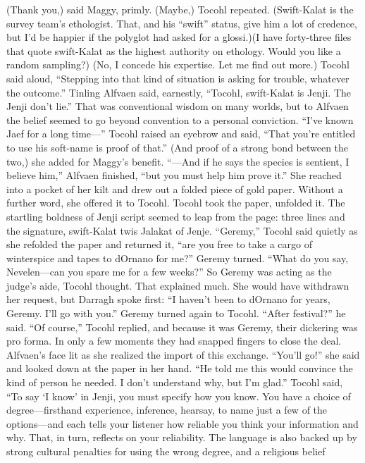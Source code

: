 \documentclass[9pt]{article}
\begin{document}
(Thank you,) said Maggy, primly.
(Maybe,) Tocohl repeated. (Swift-Kalat is the survey team’s ethologist. That, and his “swift” status,
give him a lot of credence, but I’d be happier if the polyglot had asked for a glossi.)(I have forty-three files that quote swift-Kalat as the highest authority on ethology. Would you like a
random sampling?)
(No, I concede his expertise. Let me find out more.) Tocohl said aloud, “Stepping into that kind of
situation is asking for trouble, whatever the outcome.”
Tinling Alfvaen said, earnestly, “Tocohl, swift-Kalat is Jenji. The Jenji don’t lie.” That was
conventional wisdom on many worlds, but to Alfvaen the belief seemed to go beyond convention to a
personal conviction. “I’ve known Jaef for a long time—”
Tocohl raised an eyebrow and said, “That you’re entitled to use his soft-name is proof of that.” (And
proof of a strong bond between the two,) she added for Maggy’s benefit.
“—And if he says the species is sentient, I believe him,” Alfvaen finished, “but you must help him
prove it.” She reached into a pocket of her kilt and drew out a folded piece of gold paper. Without a
further word, she offered it to Tocohl.
Tocohl took the paper, unfolded it. The startling boldness of Jenji script seemed to leap from the
page: three lines and the signature, swift-Kalat twis Jalakat of Jenje.
“Geremy,” Tocohl said quietly as she refolded the paper and returned it, “are you free to take a
cargo of winterspice and tapes to dOrnano for me?”
Geremy turned. “What do you say, Nevelen—can you spare me for a few weeks?”
So Geremy was acting as the judge’s aide, Tocohl thought. That explained much. She would have
withdrawn her request, but Darragh spoke first: “I haven’t been to dOrnano for years, Geremy. I’ll go
with you.”
Geremy turned again to Tocohl. “After festival?” he said.
“Of course,” Tocohl replied, and because it was Geremy, their dickering was pro forma. In only a
few moments they had snapped fingers to close the deal.
Alfvaen’s face lit as she realized the import of this exchange. “You’ll go!” she said and looked down
at the paper in her hand. “He told me this would convince the kind of person he needed. I don’t
understand why, but I’m glad.”
Tocohl said, “To say ‘I know’ in Jenji, you must specify how you know. You have a choice of
degree—firsthand experience, inference, hearsay, to name just a few of the options—and each tells your
listener how reliable you think your information and why. That, in turn, reflects on your reliability. The
language is also backed up by strong cultural penalties for using the wrong degree, and a religious belief
\end{document}
